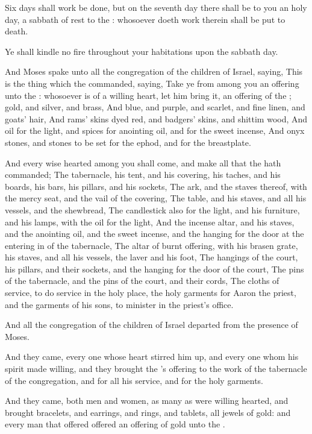\verse Six days shall work be done, but on the seventh day there shall be to you an holy day, a sabbath of rest to the \LORD: whosoever doeth work therein shall be put to death.

\verse Ye shall kindle no fire throughout your habitations upon the sabbath day.

\verse And Moses spake unto all the congregation of the children of Israel, saying, This is the thing which the \LORD commanded, saying, \verse Take ye from among you an offering unto the \LORD: whosoever is of a willing heart, let him bring it, an offering of the \LORD; gold, and silver, and brass, \verse And blue, and purple, and scarlet, and fine linen, and goats' hair, \verse And rams' skins dyed red, and badgers' skins, and shittim wood, \verse And oil for the light, and spices for anointing oil, and for the sweet incense, \verse And onyx stones, and stones to be set for the ephod, and for the breastplate.

\verse And every wise hearted among you shall come, and make all that the \LORD hath commanded; \verse The tabernacle, his tent, and his covering, his taches, and his boards, his bars, his pillars, and his sockets, \verse The ark, and the staves thereof, with the mercy seat, and the vail of the covering, \verse The table, and his staves, and all his vessels, and the shewbread, \verse The candlestick also for the light, and his furniture, and his lamps, with the oil for the light, \verse And the incense altar, and his staves, and the anointing oil, and the sweet incense, and the hanging for the door at the entering in of the tabernacle, \verse The altar of burnt offering, with his brasen grate, his staves, and all his vessels, the laver and his foot, \verse The hangings of the court, his pillars, and their sockets, and the hanging for the door of the court, \verse The pins of the tabernacle, and the pins of the court, and their cords, \verse The cloths of service, to do service in the holy place, the holy garments for Aaron the priest, and the garments of his sons, to minister in the priest's office.

\verse And all the congregation of the children of Israel departed from the presence of Moses.

\verse And they came, every one whose heart stirred him up, and every one whom his spirit made willing, and they brought the \LORD's offering to the work of the tabernacle of the congregation, and for all his service, and for the holy garments.

\verse And they came, both men and women, as many as were willing hearted, and brought bracelets, and earrings, and rings, and tablets, all jewels of gold: and every man that offered offered an offering of gold unto the \LORD.

